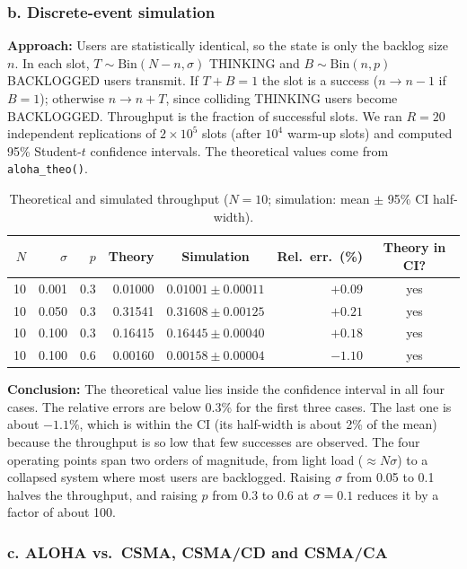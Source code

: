﻿\documentclass[12pt]{article}
\begin{document}
\subsubsection{b. Discrete-event simulation}

\textbf{Approach:} Users are statistically identical, so the state is only
the backlog size $n$. In each slot, $T\sim\mathrm{Bin}(N-n,\sigma)$ THINKING
and $B\sim\mathrm{Bin}(n,p)$ BACKLOGGED users transmit. If $T+B=1$ the slot is
a success ($n\to n-1$ if $B=1$); otherwise $n\to n+T$, since colliding
THINKING users become BACKLOGGED. Throughput is the fraction of successful
slots. We ran $R=20$ independent replications of $2\times10^5$ slots
(after $10^4$ warm-up slots) and computed 95\% Student-$t$ confidence
intervals. The theoretical values come from \texttt{aloha\_theo()}.

\begin{table}[H]
    \centering
    \caption{Theoretical and simulated throughput ($N=10$; simulation: mean $\pm$ 95\% CI half-width).}
    \label{tab:aloha-comparison}
    \begin{tabular}{rrr|rcrc}
        $N$ & $\sigma$ & $p$ & Theory & Simulation & Rel.\ err.\ (\%) & Theory in CI? \\
        \hline
        10 & 0.001 & 0.3 & 0.01000 & $0.01001 \pm 0.00011$ & $+0.09$ & yes \\
        10 & 0.050 & 0.3 & 0.31541 & $0.31608 \pm 0.00125$ & $+0.21$ & yes \\
        10 & 0.100 & 0.3 & 0.16415 & $0.16445 \pm 0.00040$ & $+0.18$ & yes \\
        10 & 0.100 & 0.6 & 0.00160 & $0.00158 \pm 0.00004$ & $-1.10$ & yes \\
    \end{tabular}
\end{table}

\textbf{Conclusion:} The theoretical value lies inside the confidence interval
in all four cases. The relative errors are below 0.3\% for the first three
cases. The last one is about $-1.1\%$, which is within the CI (its half-width is
about 2\% of the mean) because the throughput is so low that few successes
are observed. The four operating points span two orders of magnitude, from
light load ($\approx N\sigma$) to a collapsed system where most users are
backlogged. Raising $\sigma$ from 0.05 to 0.1 halves the throughput, and raising
$p$ from 0.3 to 0.6 at $\sigma=0.1$ reduces it by a factor of about 100.

\subsubsection{c. ALOHA vs.\ CSMA, CSMA/CD and CSMA/CA}
\end{document}
